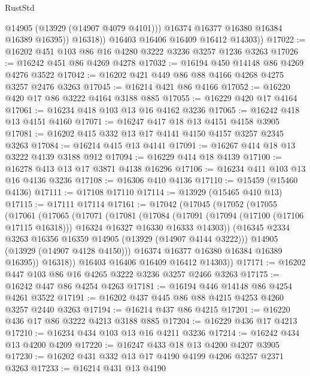 \begin{lexlean}{RustStd}
\begin{coremodule}
                  @14905
                  (@13929 (@14907 @4079 @4101)))
                @16374
                @16377
                @16380
                @16384
                @16389
                @16395))
            @16318))
        @16403
        @16406
        @16409
        @16412
        @14303))
@17022 := @16202 @451 @103 @86 @16 @4280 @3222 @3236 @3257 @1236 @3263
@17026 := @16242 @451 @86 @4269 @4278
@17032 := @16194 @450 @14148 @86 @4269 @4276 @3522
@17042 := @16202 @421 @449 @86 @88 @4166 @4268 @4275 @3257 @2476 @3263
@17045 := @16214 @421 @86 @4166
@17052 := @16220 @420 @17 @86 @3222 @4164 @3188 @885
@17055 := @16229 @420 @17 @4164
@17061 := @16234 @418 @103 @13 @16 @4162 @3236
@17065 := @16242 @418 @13 @4151 @4160
@17071 := @16247 @417 @18 @13 @4151 @4158 @3905
@17081 := @16202 @415 @332 @13 @17 @4141 @4150 @4157 @3257 @2345 @3263
@17084 := @16214 @415 @13 @4141
@17091 := @16267 @414 @18 @13 @3222 @4139 @3188 @912
@17094 := @16229 @414 @18 @4139
@17100 := @16278 @413 @13 @17 @3871 @4138 @16296
@17106 := @16234 @411 @103 @13 @16 @4136 @3236
@17108 := @16306 @410 @4136
@17110 := @15459 (@15460 @4136)
@17111 := @17108 @17110
@17114 := @13929 (@15465 @410 @13)
@17115 := @17111 @17114
@17161 := @17042
    (@17045
      (@17052
        (@17055
          (@17061
            (@17065
              (@17071
                (@17081
                  (@17084
                    (@17091
                      (@17094 (@17100 (@17106 @17115 @16318)))
                      @16324
                      @16327
                      @16330
                      @16333
                      @14303))
                  (@16345 @2334 @3263 @16356 @16359 @14905 (@13929 (@14907 @4144 @3222)))
                  @14905
                  (@13929 (@14907 @4128 @4150)))
                @16374
                @16377
                @16380
                @16384
                @16389
                @16395))
            @16318))
        @16403
        @16406
        @16409
        @16412
        @14303))
@17171 := @16202 @447 @103 @86 @16 @4265 @3222 @3236 @3257 @2466 @3263
@17175 := @16242 @447 @86 @4254 @4263
@17181 := @16194 @446 @14148 @86 @4254 @4261 @3522
@17191 := @16202 @437 @445 @86 @88 @4215 @4253 @4260 @3257 @2440 @3263
@17194 := @16214 @437 @86 @4215
@17201 := @16220 @436 @17 @86 @3222 @4213 @3188 @885
@17204 := @16229 @436 @17 @4213
@17210 := @16234 @434 @103 @13 @16 @4211 @3236
@17214 := @16242 @434 @13 @4200 @4209
@17220 := @16247 @433 @18 @13 @4200 @4207 @3905
@17230 := @16202 @431 @332 @13 @17 @4190 @4199 @4206 @3257 @2371 @3263
@17233 := @16214 @431 @13 @4190

\end{coremodule}
\end{lexlean}
